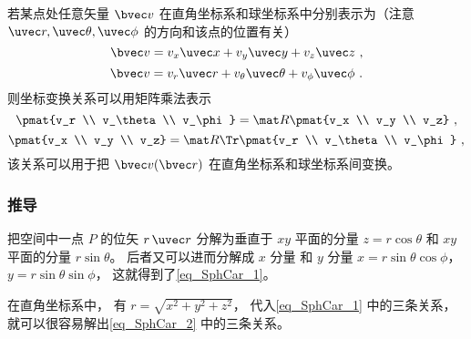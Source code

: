 若某点处任意矢量 $\bvec v$ 在直角坐标系和球坐标系中分别表示为（注意 $\uvec r, \uvec \theta, \uvec \phi$ 的方向和该点的位置有关）
\begin{equation}\label{eq_SphCar_7}
\bvec v = v_x \uvec x + v_y \uvec y + v_z \uvec z~,
\end{equation}
\begin{equation}\label{eq_SphCar_6}
\bvec v = v_r \uvec r + v_\theta \uvec \theta + v_\phi \uvec \phi~.
\end{equation}
则坐标变换关系可以用矩阵乘法表示
\begin{equation}\label{eq_SphCar_9}
\pmat{v_r \\ v_\theta \\ v_\phi}
= \mat R \pmat{v_x \\ v_y \\ v_z}~,
\end{equation}
\begin{equation}\label{eq_SphCar_8}
\pmat{v_x \\ v_y \\ v_z}
= \mat R\Tr \pmat{v_r \\ v_\theta \\ v_\phi}~,
\end{equation}
该关系可以用于把 $\bvec v(\bvec r)$ 在直角坐标系和球坐标系间变换。

\subsubsection{推导}
把空间中一点 $P$ 的位矢 $r \,\uvec r$ 分解为垂直于 $xy$ 平面的分量 $z = r\cos \theta $ 和 $xy$ 平面的分量 $r\sin \theta $。 后者又可以进而分解成 $x$ 分量 和 $y$ 分量  $x = r\sin \theta \cos \phi$，  $y = r\sin \theta \sin \phi$， 这就得到了\autoref{eq_SphCar_1}。

在直角坐标系中， 有 $r = \sqrt {x^2 + y^2 + z^2}$， 代入\autoref{eq_SphCar_1} 中的三条关系，就可以很容易解出\autoref{eq_SphCar_2} 中的三条关系。

